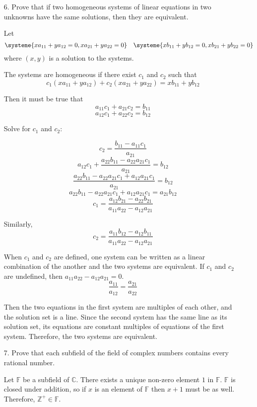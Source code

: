 \documentclass{article}
\begin{document}
\begin{enumerate}[listparindent=\parindent]
\item[6.] Prove that if two homogeneous systems of linear equations in two unknowns have the same solutions,
    then they are equivalent.

    Let
    \[
        \systeme{
            xa_{11} + ya_{12} = 0,
            xa_{21} + ya_{22} = 0
        }
        \quad
        \systeme{
            xb_{11} + yb_{12} = 0,
            xb_{21} + yb_{22} = 0
        }
    \]
    where \((x, y)\) is a solution to the systems.

    The systems are homogeneous if there exist \(c_1\) and \(c_2\) such that
    \[c_1(xa_{11} + ya_{12}) + c_2(xa_{21} + ya_{22}) = xb_{11} + yb_{12}\]

    Then it must be true that
    \[a_{11}c_1 + a_{21}c_2 = b_{11}\]
    \[a_{12}c_1 + a_{22}c_2 = b_{12}\]

    Solve for \(c_1\) and \(c_2\):

    \[c_2 = \frac{b_{11} - a_{11}c_1} {a_{21}}\]
    \[a_{12}c_1 + \frac{a_{22}b_{11} - a_{22}a_{21}c_1} {a_{21}} = b_{12}\]
    \[\frac{a_{22}b_{11} - a_{22}a_{21}c_1 + a_{12}a_{21}c_1} {a_{21}} = b_{12}\]
    \[a_{22}b_{11} - a_{22}a_{21}c_1 + a_{12}a_{21}c_1 = a_{21}b_{12}\]
    \[c_1 = \frac{a_{12}b_{21} - a_{22}b_{21}} {a_{11}a_{22} - a_{12}a_{21}}\]

    Similarly,
    \[c_2 = \frac{a_{11}b_{12} - a_{12}b_{11}} {a_{11}a_{22} - a_{12}a_{21}}\]

    When \(c_1\) and \(c_2\) are defined, one system can be written
    as a linear combination of the another and the two systems are equivalent.
    If \(c_1\) and \(c_2\) are undefined, then
    \(a_{11}a_{22} - a_{12}a_{21} = 0\).
    \[\frac{a_{11}}{a_{12}} = \frac{a_{21}}{a_{22}}\]

    Then the two equations in the first system are multiples of each other, and the solution set is a line.
    Since the second system has the same line as its solution set,
    its equations are constant multiples of equations of the first system.
    Therefore, the two systems are equivalent.

\item[7.] Prove that each subfield of the field of complex numbers contains every rational number.

Let \(\mathbb F\) be a subfield of \(\mathbb C\).
There exists a unique non-zero element \(1\) in \(\mathbb F\).
\(\mathbb F\) is closed under addition, so if \(x\) is an element of \(\mathbb F\) then \(x + 1\) must be as well.
Therefore, \(\mathbb Z^+ \in \mathbb F\).


\end{enumerate}
\end{document}
